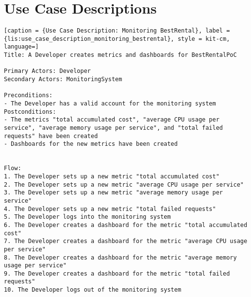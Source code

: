 \section{Use Case Descriptions}


\vspace{0.5cm}
\begin{lstlisting}[caption = {Use Case Description: Monitoring BestRental}, label = {lis:use_case_description_monitoring_bestrental}, style = kit-cm, language=] 
Title: A Developer creates metrics and dashboards for BestRentalPoC

Primary Actors: Developer
Secondary Actors: MonitoringSystem

Preconditions:
- The Developer has a valid account for the monitoring system
Postconditions:
- The metrics "total accumulated cost", "average CPU usage per service", "average memory usage per service", and "total failed requests" have been created
- Dashboards for the new metrics have been created


Flow:
1. The Developer sets up a new metric "total accumulated cost"
2. The Developer sets up a new metric "average CPU usage per service"
3. The Developer sets up a new metric "average memory usage per service"
4. The Developer sets up a new metric "total failed requests"
5. The Developer logs into the monitoring system
6. The Developer creates a dashboard for the metric "total accumulated cost"
7. The Developer creates a dashboard for the metric "average CPU usage per service"
8. The Developer creates a dashboard for the metric "average memory usage per service"
9. The Developer creates a dashboard for the metric "total failed requests"
10. The Developer logs out of the monitoring system

\end{lstlisting}

